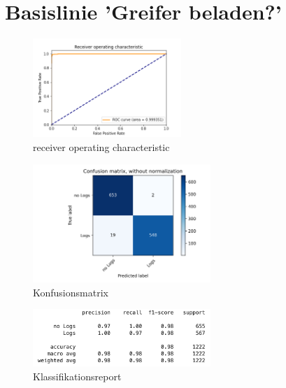 \chapter{Basislinie 'Greifer beladen?'}
\label{appendix:BasislinieBaumstämme}

\begin{figure}[h]
	\centering
	\includegraphics[width=0.5\textwidth, center]{bilder/Anhang/Baseline/Logs/Logs_validation/Logs_Baseline_ROC.png}
	\caption[Baumstammklassifikation Basislinie ROC]{receiver operating characteristic}
	\label{img:BaselineLogsROC}
\end{figure}	

\begin{figure}[h]
	\centering
	\includegraphics[width=0.6\textwidth, center]{bilder/Anhang/Baseline/Logs/Logs_validation/Logs_Baseline_Confusion_Matrix.png}
	\caption[Konfusionsmatrix Baumstammklassifikation Basislinie]{Konfusionsmatrix}
	\label{img:BaselineLogsConfusionMatrix}
\end{figure}	

\begin{figure}[h]
	\centering
	\includegraphics[width=0.6\textwidth, center]{bilder/Anhang/Baseline/Logs/Logs_validation/classification_report.png}
	\caption[Klassifikationsreport Baumstammklassifikation Basislinie]{Klassifikationsreport}
	\label{img:BaselineLogsKlassifikationsreport}
\end{figure}	
